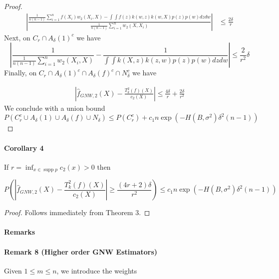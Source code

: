 \documentclass{article}
\DeclareMathOperator\supp{supp}
\begin{document}
\begin{proof}
\begin{equation*}
    \begin{split}
    |\frac{\frac{1}{n(n-1)}\sum_{i=1}^n f(X_i)w_2(X_i,X)-\int \int f(z)k(w,z)k(w,X)p(z)p(w)dzdw
    }{\frac{1}{n(n-1)}
    \sum_{i=1}^n w_2(X,X_i)}|&\leq \frac{2\delta}{r}
    \end{split}
\end{equation*}
Next, on $C_r\cap A_{\delta}(1)^c$ we have 
\begin{equation*}
    |\frac{1}{\frac{1}{n(n-1)}\sum_{i=1}^n w_2(X_i,X)}
    -\frac{1}{\int\int k(X,z)k(z,w)p(z)p(w)dzdw}|\leq \frac{2}{r^2}\delta
\end{equation*}
Finally, 
on $C_r\cap A_{\delta}(1)^c\cap A_{\delta}(f)^c\cap N_{\delta}^c$ we have

\begin{equation*}
    \begin{split}
         |\hat{f}_{GNW,2}(X)-\frac{T_k^2(f)(X)}{c_2(X)}|\leq \frac{4\delta}{r}+\frac{2\delta}{r^2}
    \end{split}
\end{equation*}
We conclude with a union bound
\begin{equation*}
    P(C_r^c\cup A_{\delta}(1)\cup A_{\delta}(f)\cup N_{\delta})\leq P(C_r^c)+c_1n\exp(-H(B,\sigma^2)\delta^2(n-1))
\end{equation*}
\end{proof}
\paragraph{Corollary 4} If $r=\inf_{x\in \supp p} c_2(x)>0$ then

\begin{equation*}
   P(|\hat{f}_{GNW,2}(X)-\frac{T_k^2(f)(X)}{c_2(X)}|
   \geq \frac{(4r+2)\delta}{r^2})\leq c_1n\exp(-H(B,\sigma^2)\delta^2(n-1))
\end{equation*}
\begin{proof}
Follows immediately from Theorem 3.
\end{proof}

\paragraph{Remarks}

\paragraph{Remark 8 (Higher order GNW Estimators)}
Given $1\leq m\leq n$, we introduce the weights
\end{document}
